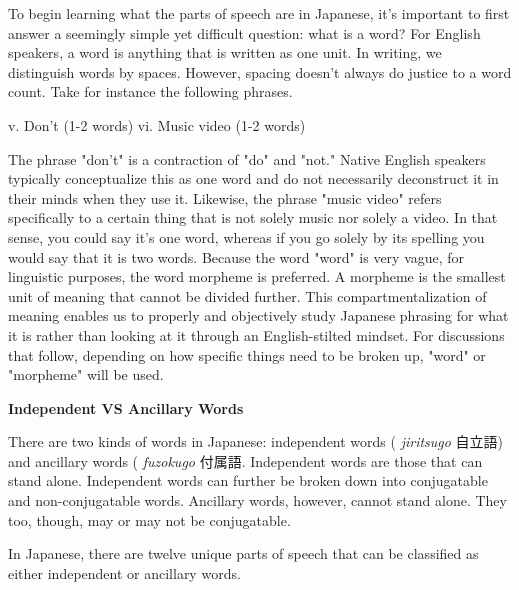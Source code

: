 \par{ To begin learning what the parts of speech are in Japanese, it's important to first answer a seemingly simple yet difficult question: what is a word? For English speakers, a word is anything that is written as one unit. In writing, we distinguish words by spaces. However, spacing doesn't always do justice to a word count. Take for instance the following phrases. }

\par{v. Don't (1-2 words) \hfill\break
vi. Music video (1-2 words) }

\par{ The phrase "don't" is a contraction of "do" and "not." Native English speakers typically conceptualize this as one word and do not necessarily deconstruct it in their minds when they use it. Likewise, the phrase "music video" refers specifically to a certain thing that is not solely music nor solely a video. In that sense, you could say it's one word, whereas if you go solely by its spelling you would say that it is two words. Because the word "word" is very vague, for linguistic purposes, the word morpheme is preferred. A morpheme is the smallest unit of meaning that cannot be divided further. This compartmentalization of meaning enables us to properly and objectively study Japanese phrasing for what it is rather than looking at it through an English-stilted mindset. For discussions that follow, depending on how specific things need to be broken up, "word" or "morpheme" will be used. }

\begin{center}
\textbf{Independent VS Ancillary Words }
\end{center}

\par{ There are two kinds of words in Japanese: independent words ( \emph{jiritsugo }自立語) and ancillary words ( \emph{fuzokugo }付属語. Independent words are those that can stand alone. Independent words can further be broken down into conjugatable and non-conjugatable words. Ancillary words, however, cannot stand alone. They too, though, may or may not be conjugatable. }

\par{ In Japanese, there are twelve unique parts of speech that can be classified as either independent or ancillary words. }

